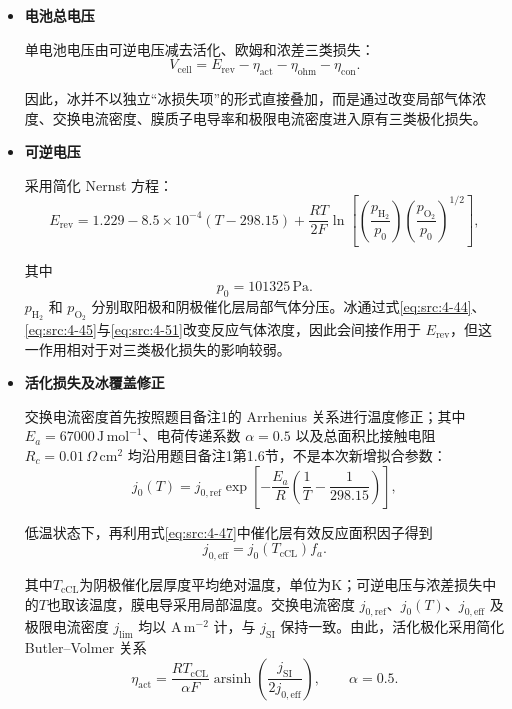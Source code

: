 \documentclass[bwprint]{gmcmthesis}
\numberwithin{equation}{section}
\numberwithin{figure}{section}
\begin{document}
\begin{itemize}
\renewcommand{\labelitemi}{$\blacktriangleright$}
\item \textbf {电池总电压}

 单电池电压由可逆电压减去活化、欧姆和浓差三类损失：
\begin{equation}
V_{\text{cell}} = E_{\text{rev}} - \eta_{\text{act}} - \eta_{\text{ohm}} - \eta_{\text{con}}. \label{eq:src:4-72}
\end{equation}

 因此，冰并不以独立“冰损失项”的形式直接叠加，而是通过改变局部气体浓度、交换电流密度、膜质子电导率和极限电流密度进入原有三类极化损失。

\item \textbf {可逆电压}

 采用简化 Nernst 方程：
\begin{equation}
E_{\text{rev}} = 1.229 - 8.5 \times 10^{-4}(T - 298.15) + \frac{RT}{2F} \ln \left[ \left( \frac{p_{\text{H}_2}}{p_0} \right) \left( \frac{p_{\text{O}_2}}{p_0} \right)^{1/2} \right], \label{eq:src:4-73}
\end{equation}

 其中
\[
p_0 = 101325 \, \text{Pa}.
\]
\(p_{\text{H}_2}\) 和 \(p_{\text{O}_2}\) 分别取阳极和阴极催化层局部气体分压。冰通过式\eqref{eq:src:4-44}、\eqref{eq:src:4-45}与\eqref{eq:src:4-51}改变反应气体浓度，因此会间接作用于 \(E_{\text{rev}}\)，但这一作用相对于对三类极化损失的影响较弱。


\item \textbf {活化损失及冰覆盖修正}

交换电流密度首先按照题目备注1的 Arrhenius 关系进行温度修正；其中 $E_a=67000\,\mathrm{J\,mol^{-1}}$、电荷传递系数 $\alpha=0.5$ 以及总面积比接触电阻 $R_c=0.01\,\Omega\,\mathrm{cm^2}$ 均沿用题目备注1第1.6节，不是本次新增拟合参数：
\begin{equation}
j_0(T) = j_{0,\text{ref}} \exp \left[ -\frac{E_a}{R} \left( \frac{1}{T} - \frac{1}{298.15} \right) \right], \label{eq:src:4-74}
\end{equation}


 低温状态下，再利用式\eqref{eq:src:4-47}中催化层有效反应面积因子得到
\[
j_{0,\text{eff}} = j_0(T_{\text{cCL}}) f_a.
\]

 其中$T_{\mathrm{cCL}}$为阴极催化层厚度平均绝对温度，单位为K；可逆电压与浓差损失中的$T$也取该温度，膜电导采用局部温度。交换电流密度 $j_{0,\mathrm{ref}}$、$j_0(T)$、$j_{0,\mathrm{eff}}$ 及极限电流密度 $j_{\mathrm{lim}}$ 均以 $\mathrm{A\,m^{-2}}$ 计，与 $j_{\mathrm{SI}}$ 保持一致。由此，活化极化采用简化 Butler--Volmer 关系
\begin{equation}
\eta_{\text{act}} = \frac{RT_{\mathrm{cCL}}}{\alpha F} \operatorname{arsinh} \left( \frac{j_{\mathrm{SI}}}{2j_{0,\text{eff}}} \right), \qquad \alpha = 0.5. \label{eq:src:4-75}
\end{equation}


\end{itemize}
\end{document}
